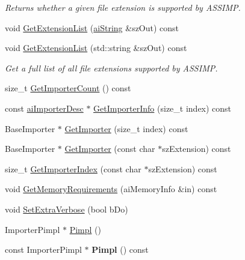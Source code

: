 \begin{DoxyCompactItemize}
\begin{DoxyCompactList}\small\item\em Returns whether a given file extension is supported by A\-S\-S\-I\-M\-P. \end{DoxyCompactList}\item 
void \hyperlink{class_assimp_1_1_importer_a23c85647f7977012d9fef20b36c2d579}{Get\-Extension\-List} (\hyperlink{structai_string}{ai\-String} \&sz\-Out) const 
\item 
void \hyperlink{class_assimp_1_1_importer_a6ab684351c55e170de3c5b7d730b306d}{Get\-Extension\-List} (std\-::string \&sz\-Out) const 
\begin{DoxyCompactList}\small\item\em Get a full list of all file extensions supported by A\-S\-S\-I\-M\-P. \end{DoxyCompactList}\item 
size\-\_\-t \hyperlink{class_assimp_1_1_importer_afe982451f1a1c9b0b59c788f9329ccc1}{Get\-Importer\-Count} () const 
\item 
const \hyperlink{structai_importer_desc}{ai\-Importer\-Desc} $\ast$ \hyperlink{class_assimp_1_1_importer_a857dd22e071521c7747dc909f6a8f6f9}{Get\-Importer\-Info} (size\-\_\-t index) const 
\item 
Base\-Importer $\ast$ \hyperlink{class_assimp_1_1_importer_a712a0545a11c9d198392867552ba6646}{Get\-Importer} (size\-\_\-t index) const 
\item 
Base\-Importer $\ast$ \hyperlink{class_assimp_1_1_importer_a18921ab411273fa95961f60848ad6007}{Get\-Importer} (const char $\ast$sz\-Extension) const 
\item 
size\-\_\-t \hyperlink{class_assimp_1_1_importer_aee103460f66b9cbe3143400ec92ffc56}{Get\-Importer\-Index} (const char $\ast$sz\-Extension) const 
\item 
void \hyperlink{class_assimp_1_1_importer_aba2eacd0b627cb481b6d66d9ca55eac9}{Get\-Memory\-Requirements} (ai\-Memory\-Info \&in) const 
\item 
void \hyperlink{class_assimp_1_1_importer_a9bb793072c84c784279d0f6e870bb42d}{Set\-Extra\-Verbose} (bool b\-Do)
\item 
Importer\-Pimpl $\ast$ \hyperlink{class_assimp_1_1_importer_ac112839f323a630f83395acb74746827}{Pimpl} ()
\item 
\hypertarget{class_assimp_1_1_importer_a6bf9560ac8b1353ae809ff1d99c9c661}{const Importer\-Pimpl $\ast$ {\bfseries Pimpl} () const }\label{class_assimp_1_1_importer_a6bf9560ac8b1353ae809ff1d99c9c661}

\end{DoxyCompactItemize}
